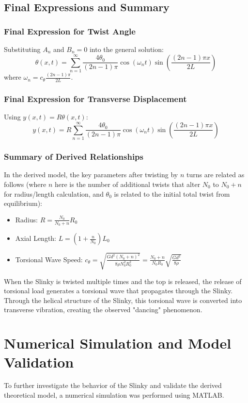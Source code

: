 \documentclass{mcmthesis}  %
\begin{document}
\subsection{Final Expressions and Summary}

\subsubsection{Final Expression for Twist Angle}
Substituting \(A_n\) and \(B_n=0\) into the general solution:
\[ \theta(x,t) = \sum_{n=1}^{\infty} \frac{4\theta_0}{(2n-1)\pi} \cos(\omega_n t) \sin\left(\frac{(2n-1)\pi x}{2L}\right) \]
where \(\omega_n = c_{\theta} \frac{(2n-1)\pi}{2L}\).

\subsubsection{Final Expression for Transverse Displacement}
Using \(y(x,t) = R \theta(x,t)\):
\[ y(x,t) = R \sum_{n=1}^{\infty} \frac{4\theta_0}{(2n-1)\pi} \cos(\omega_n t) \sin\left(\frac{(2n-1)\pi x}{2L}\right) \]

\subsubsection{Summary of Derived Relationships}
In the derived model, the key parameters after twisting by \(n\) turns are related as follows (where \(n\) here is the number of additional twists that alter \(N_0\) to \(N_0+n\) for radius/length calculation, and \(\theta_0\) is related to the initial total twist from equilibrium):
\begin{itemize}
    \item Radius: \(R = \frac{N_0}{N_0+n} R_0\)
    \item Axial Length: \(L = \left(1 + \frac{n}{N_0}\right) L_0\)
    \item Torsional Wave Speed: \(c_{\theta} = \sqrt{\frac{G d^2 (N_0+n)^2}{8 \rho N_0^2 R_0^2}} = \frac{N_0+n}{N_0 R_0} \sqrt{\frac{G d^2}{8 \rho}}\) 
\end{itemize}

When the Slinky is twisted multiple times and the top is released, the release of torsional load generates a torsional wave that propagates through the Slinky. Through the helical structure of the Slinky, this torsional wave is converted into transverse vibration, creating the observed "dancing" phenomenon.

\section{Numerical Simulation and Model Validation}
To further investigate the behavior of the Slinky and validate the derived theoretical model, a numerical simulation was performed using MATLAB.
\end{document}
